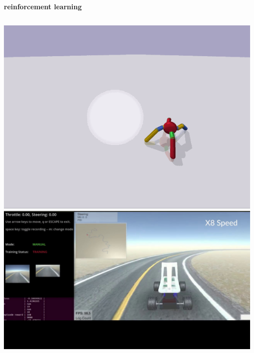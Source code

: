 \documentclass[xcolor=dvipsnames]{beamer}
\begin{document}
\begin{frame}{\bf reinforcement learning}

  \begin{columns}

    \begin{column}{0.5\textwidth}
      {\centering \includegraphics[scale=0.2]{../images/ant.png}}
      {\centering \includegraphics[scale=0.1]{../images/sac_car.jpg}}
    \end{column}


\end{columns}
\end{frame}
\end{document}

